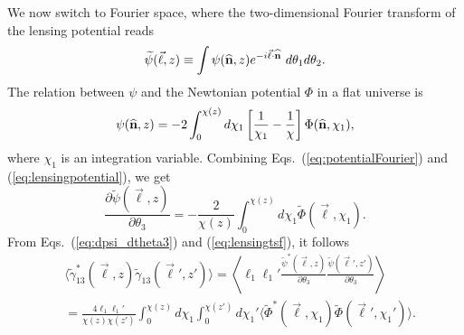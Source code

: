 We now switch to Fourier space, where the two-dimensional Fourier transform of the lensing potential reads
\begin{equation}
\widetilde{\psi}(\vec{\ell},z)\equiv\int\psi({\bf\widehat{n}},z)e^{-i\vec{\ell}\cdot{\bf{\widehat n}}}\ d\theta_1 d\theta_2.
\label{eq:potentialFourier}
\end{equation}
The relation between $\psi$ and the Newtonian potential $\Phi$ in a flat universe is
\begin{equation}
\psi({\bf{\widehat n}},z)=
-2\int_0^{\chi(z)}d\chi_1\left[\frac{1}{\chi_1}-\frac{1}{\chi}\right]\Phi({\bf{\widehat n}},\chi_1),
\label{eq:lensingpotential}
\end{equation}
where $\chi_1$ is an integration variable.
Combining Eqs.~(\ref{eq:potentialFourier}) and (\ref{eq:lensingpotential}), we get 
\begin{equation}
\frac{\partial\widetilde{\psi}(\vec{\ell},z)}{\partial\theta_3}=-\frac{2}{\chi(z)}\int_0^{\chi(z)} d\chi_1\widetilde{\Phi}(\vec{\ell},\chi_1).
\label{eq:dpsi_dtheta3}
\end{equation}
From Eqs.~(\ref{eq:dpsi_dtheta3}) and (\ref{eq:lensingtsf}), it follows 
\begin{align}
&\langle\widetilde{\gamma}_{13}^*(\vec{\ell},z)\widetilde{\gamma}_{13}(\vec{\ell}',z')\rangle=\left\langle \ell_1\ell_1'\frac{\widetilde{\psi}^*(\vec{\ell},z)}{\partial\theta_3}\frac{\widetilde{\psi}(\vec{\ell}',z')}{\partial\theta_3}\right\rangle\nonumber\\
&=\frac{4\ell_1\ell_1'}{\chi(z)\chi(z')}\int_0^{\chi(z)}d\chi_1\int_0^{\chi(z')}d\chi_1'\langle\widetilde{\Phi}^*(\vec{\ell},\chi_1)\widetilde{\Phi}(\vec{\ell}',\chi_1')\rangle.
\end{align}

